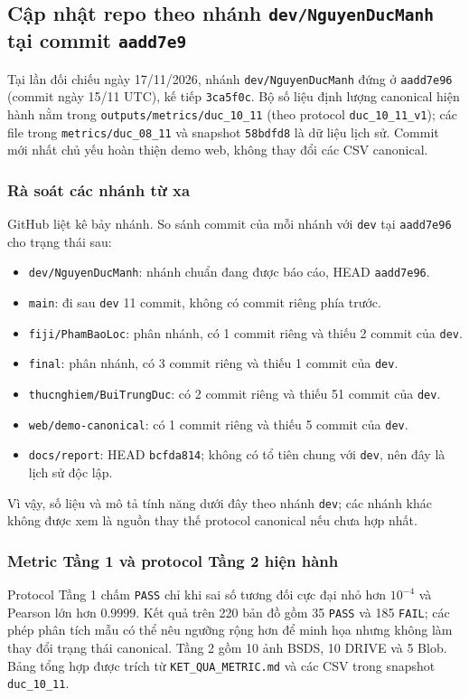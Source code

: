 \subsection{Cập nhật repo theo nhánh \texttt{dev/NguyenDucManh} tại commit \texttt{aadd7e9}}
\label{sec:repo-update}
Tại lần đối chiếu ngày 17/11/2026, nhánh \texttt{dev/NguyenDucManh} đứng ở
\texttt{aadd7e96} (commit ngày 15/11 UTC), kế tiếp \texttt{3ca5f0c}. Bộ số liệu
định lượng canonical hiện hành nằm trong \texttt{outputs/metrics/duc\_10\_11}
(theo protocol \texttt{duc\_10\_11\_v1}); các file trong
\texttt{metrics/duc\_08\_11} và snapshot \texttt{58bdfd8} là dữ liệu lịch sử.
Commit mới nhất chủ yếu hoàn thiện demo web, không thay đổi các CSV canonical.

\subsubsection{Rà soát các nhánh từ xa}
GitHub liệt kê bảy nhánh. So sánh commit của mỗi nhánh với \texttt{dev} tại
\texttt{aadd7e96} cho trạng thái sau:
\begin{itemize}
    \item \texttt{dev/NguyenDucManh}: nhánh chuẩn đang được báo cáo, HEAD \texttt{aadd7e96}.
    \item \texttt{main}: đi sau \texttt{dev} 11 commit, không có commit riêng phía trước.
    \item \texttt{fiji/PhamBaoLoc}: phân nhánh, có 1 commit riêng và thiếu 2 commit của \texttt{dev}.
    \item \texttt{final}: phân nhánh, có 3 commit riêng và thiếu 1 commit của \texttt{dev}.
    \item \texttt{thucnghiem/BuiTrungDuc}: có 2 commit riêng và thiếu 51 commit của \texttt{dev}.
    \item \texttt{web/demo-canonical}: có 1 commit riêng và thiếu 5 commit của \texttt{dev}.
    \item \texttt{docs/report}: HEAD \texttt{bcfda814}; không có tổ tiên chung với \texttt{dev}, nên đây là lịch sử độc lập.
\end{itemize}
Vì vậy, số liệu và mô tả tính năng dưới đây theo nhánh \texttt{dev}; các nhánh
khác không được xem là nguồn thay thế protocol canonical nếu chưa hợp nhất.

\subsubsection{Metric Tầng 1 và protocol Tầng 2 hiện hành}
Protocol Tầng 1 chấm \texttt{PASS} chỉ khi sai số tương đối cực đại nhỏ hơn
$10^{-4}$ và Pearson lớn hơn $0.9999$. Kết quả trên 220 bản đồ gồm 35
\texttt{PASS} và 185 \texttt{FAIL}; các phép phân tích mẫu có thể nêu ngưỡng
rộng hơn để minh họa nhưng không làm thay đổi trạng thái canonical.
Tầng 2 gồm 10 ảnh BSDS, 10 DRIVE và 5 Blob. Bảng tổng hợp được trích từ
\texttt{KET\_QUA\_METRIC.md} và các CSV trong snapshot \texttt{duc\_10\_11}.

